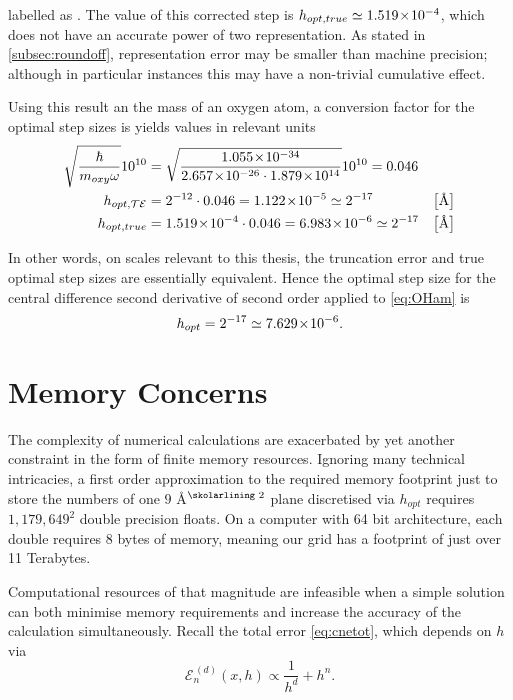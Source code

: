 labelled as .
The value of this corrected step is $h_{opt,true} \simeq 1.519\!\times\!10^{-4}$, which does not have an accurate power of two representation.
As stated in \cref{subsec:roundoff}, representation error may be smaller than machine precision; although in particular instances this may have a non-trivial cumulative effect.

Using this result an the mass of an oxygen atom, a conversion factor for the optimal step sizes is yields values in relevant units
\begin{align}
\sqrt{\frac{\hbar}{m_{oxy}\omega}}10^{10} &= \sqrt{\frac{1.055\ten{-34}}{2.657\ten{-26}\cdot1.879\ten{14}}}10^{10} = 0.046\label{eq:confact} \\
h_{opt,\mathcal{TE}} &= 2^{-12}\cdot0.046 = 1.122\ten{-5} \simeq 2^{-17} & \left[\text{Å}\right]\\
h_{opt,true} &= 1.519\ten{-4}\cdot0.046 = 6.983\ten{-6} \simeq 2^{-17} & \left[\text{Å}\right]
\end{align}

In other words, on scales relevant to this thesis, the truncation error and true optimal step sizes are essentially equivalent.
Hence the optimal step size for the central difference second derivative of second order applied to \cref{eq:OHam} is
\begin{equation}
h_{opt} = 2^{-17} \simeq 7.629\!\times\!10^{-6}.
\end{equation}

\section{Memory Concerns}\label{sec:memcons}

The complexity of numerical calculations are exacerbated by yet another constraint in the form of finite memory resources.
Ignoring many technical intricacies, a first order approximation to the required memory footprint just to store the numbers of one $9$ Å$^\text{\skolarlining 2}$ plane discretised via $h_{opt}$ requires $1,179,649^2$ double precision floats.
On a computer with 64 bit architecture, each double requires 8 bytes of memory, meaning our grid has a footprint of just over 11 Terabytes.

Computational resources of that magnitude are infeasible when a simple solution can both minimise memory requirements and increase the accuracy of the calculation simultaneously.
Recall the total error \cref{eq:cnetot}, which depends on $h$ via
\begin{equation}
\mathcal{E}_n^{\,(d)}(x,h) \propto \frac{1}{h^d} + h^n.
\end{equation}

